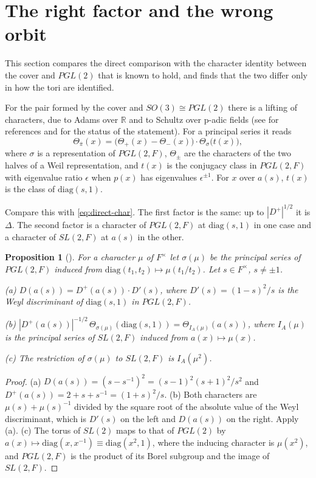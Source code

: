 \documentclass[12pt,letterpaper,openany]{book}
\theoremstyle{plain}
\newtheorem{proposition}[theorem]{Proposition}
\theoremstyle{definition}
\theoremstyle{remark}
\theoremstyle{remark}
\begin{document}
\section{The right factor and the wrong orbit}\label{sec:cover-orbit}

This section compares the direct comparison with the character identity
between the cover and $PGL(2)$ that is known to hold, and finds that the
two differ only in how the tori are identified.

For the pair formed by the cover and $SO(3)\cong PGL(2)$ there is a
lifting of characters, due to Adams \cite{Ad2} over ${\mathbb R}$ and to
Schultz over p-adic fields (see \cite[\S7.7]{JC} for references and for
the status of the statement). For a principal series it reads
\begin{equation}\label{eq:adams}
\Theta_{\overline\pi}(x)=\bigl(\Theta_+(x)-\Theta_-(x)\bigr)\cdot
\Theta_\sigma\bigl(t(x)\bigr),
\end{equation}
where $\sigma$ is a representation of $PGL(2,F)$, $\Theta_\pm$ are the
characters of the two halves of a Weil representation, and $t(x)$ is the
conjugacy class in $PGL(2,F)$ with eigenvalue ratio $\epsilon$ when
$p(x)$ has eigenvalues $\epsilon^{\pm1}$. For $x$ over $a(s)$, $t(x)$ is
the class of $\mathrm{diag}(s,1)$.

Compare this with \eqref{eq:direct-char}. The first factor is the same:
up to $|D^+|^{1/2}$ it is $\Delta$. The second factor is a character of
$PGL(2,F)$ at $\mathrm{diag}(s,1)$ in one case and a character of
$SL(2,F)$ at $a(s)$ in the other.

\begin{proposition}[{\cite[Proposition~8.3]{JC}}]\label{prop:wrong-orbit}
For a character $\mu$ of $F^\times$ let $\sigma(\mu)$ be the principal
series of $PGL(2,F)$ induced from
$\mathrm{diag}(t_1,t_2)\mapsto\mu(t_1/t_2)$. Let $s\in F^\times$,
$s\neq\pm1$.

(a) $D(a(s))=D^+(a(s))\cdot D'(s)$, where $D'(s)=(1-s)^2/s$ is the Weyl
discriminant of $\mathrm{diag}(s,1)$ in $PGL(2,F)$.

(b) $|D^+(a(s))|^{-1/2}\,\Theta_{\sigma(\mu)}(\mathrm{diag}(s,1))
=\Theta_{I_A(\mu)}(a(s))$, where $I_A(\mu)$ is the principal series of
$SL(2,F)$ induced from $a(x)\mapsto\mu(x)$.

(c) The restriction of $\sigma(\mu)$ to $SL(2,F)$ is $I_A(\mu^2)$.
\end{proposition}

\begin{proof}
(a) $D(a(s))=(s-s^{-1})^2=(s-1)^2(s+1)^2/s^2$ and
$D^+(a(s))=2+s+s^{-1}=(1+s)^2/s$. (b) Both characters are
$\mu(s)+\mu(s)^{-1}$ divided by the square root of the absolute value of
the Weyl discriminant, which is $D'(s)$ on the left and $D(a(s))$ on the
right. Apply (a). (c) The torus of $SL(2)$ maps to that of $PGL(2)$ by
$a(x)\mapsto\mathrm{diag}(x,x^{-1})\equiv\mathrm{diag}(x^2,1)$, where the
inducing character is $\mu(x^2)$, and $PGL(2,F)$ is the product of its
Borel subgroup and the image of $SL(2,F)$.
\end{proof}
\end{document}
